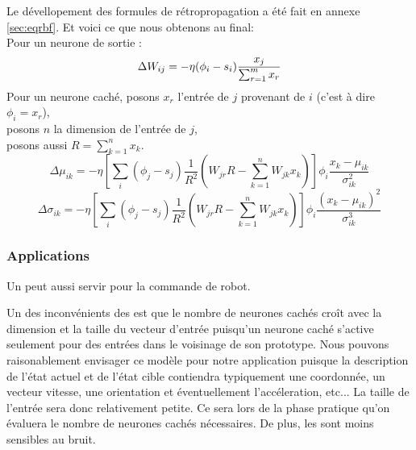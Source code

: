 Le dévellopement des formules de rétropropagation a été fait en annexe \ref{sec:eqrbf}.
Et voici ce que nous obtenons au final:\\
Pour un neurone de sortie :
\[\Delta W_{ij} = -\eta (\phi_i - s_i) \frac{x_j}{\sum_{r=1}^{m}x_{r}}\]
Pour un neurone caché, posons $x_r$ l'entrée de $j$ provenant de $i$ (c'est à dire $\phi_i = x_r$),\\
posons $n$ la dimension de l'entrée de $j$,\\
posons aussi $R = \sum_{k=1}^{n}x_k$.
\[\Delta\mu_{ik} = -\eta \left[\sum_{i}(\phi_j - s_j) \frac{1}{R^2} \left(W_{jr}R - \sum_{k=1}^{n}W_{jk}x_k\right)\right] \phi_i\frac{x_k-\mu_{ik}}{\sigma_{ik}^2}\]
\[\Delta \sigma_{ik} = -\eta \left[\sum_{i}(\phi_j - s_j) \frac{1}{R^2} \left(W_{jr}R - \sum_{k=1}^{n}W_{jk}x_k\right)\right] \phi_i \frac{(x_k-\mu_{ik})^2}{\sigma_{ik}^3}\]

\subsubsection{Applications}
Un \rbf peut aussi servir pour la commande de robot.\cite{Gauthier}

Un des inconvénients des \rbf est que le nombre de neurones cachés croît avec la dimension et la taille du vecteur d'entrée puisqu'un neurone caché s'active seulement pour des entrées dans le voisinage de son prototype.
Nous pouvons raisonablement envisager ce modèle pour notre application puisque la description de l'état actuel et de l'état cible contiendra typiquement une coordonnée, un vecteur vitesse, une orientation et éventuellement l'accéleration, etc...
La taille de l'entrée sera donc relativement petite. Ce sera lors de la phase pratique qu'on évaluera le nombre de neurones cachés nécessaires.
De plus, les \rbf sont moins sensibles au bruit.\cite{adversarial}